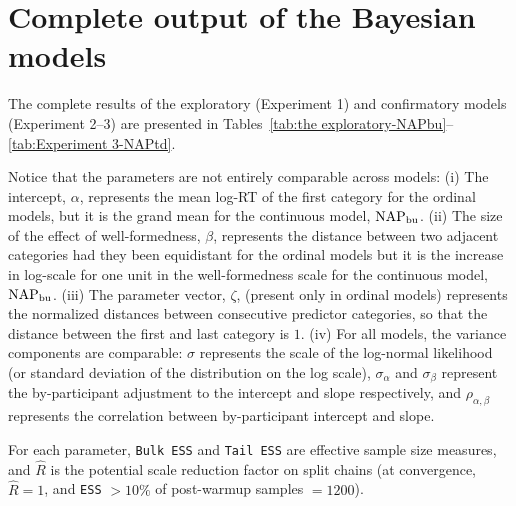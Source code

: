 \chapter{Complete output of the Bayesian models}\label{appendix:a}

The complete results of the exploratory (Experiment 1) and confirmatory
models (Experiment 2–3) are presented in Tables~\ref{tab:the exploratory-NAPbu}--\ref{tab:Experiment 3-NAPtd}.

Notice that the parameters are not entirely comparable across models:
(i) The intercept, \(\alpha\), represents the mean log-RT of the first
category for the ordinal models, but it is the grand mean for the
continuous model, \(\operatorname{NAP}_{\text{bu}}\). (ii) The size of the effect of
well-formedness, \(\beta\), represents the distance between two adjacent
categories had they been equidistant for the ordinal models but it is
the increase in log-scale for one unit in the well-formedness scale for
the continuous model, \(\operatorname{NAP}_{\text{bu}}\). (iii) The parameter vector,
\(\zeta\), (present only in ordinal models) represents the normalized
distances between consecutive predictor categories, so that the distance
between the first and last category is \(1\). (iv) For all models, the
variance components are comparable: \(\sigma\) represents the scale of
the log-normal likelihood (or standard deviation of the distribution on
the log scale), \(\sigma_\alpha\) and \(\sigma_\beta\) represent the
by-participant adjustment to the intercept and slope respectively, and
\(\rho_{\alpha,\beta}\) represents the correlation between
by-participant intercept and slope.

For each parameter, \texttt{Bulk\ ESS} and \texttt{Tail\ ESS} are
effective sample size measures, and $\hat{R}$ is the potential scale
reduction factor on split chains (at convergence, $\hat{R} = 1$, and
\texttt{ESS} \(> 10\%\) of post-warmup samples \(=1200\)).



